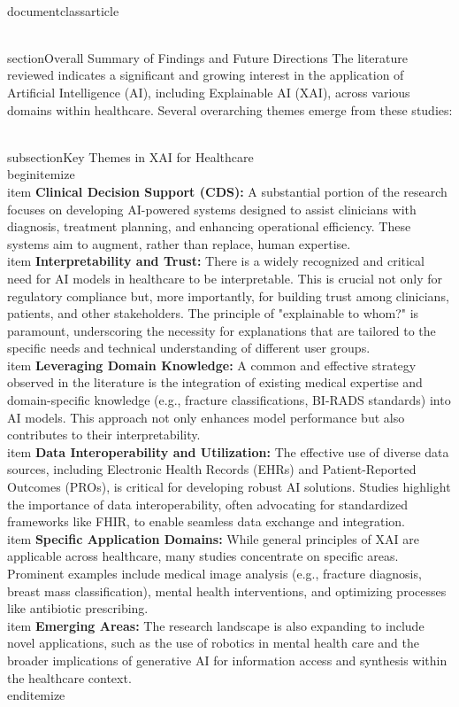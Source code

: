 \\documentclass{article}
\begin{document}
\\section{Overall Summary of Findings and Future Directions}
The literature reviewed indicates a significant and growing interest in the application of Artificial Intelligence (AI), including Explainable AI (XAI), across various domains within healthcare. Several overarching themes emerge from these studies:

\\subsection{Key Themes in XAI for Healthcare}
\\begin{itemize}
    \\item \textbf{Clinical Decision Support (CDS):} A substantial portion of the research focuses on developing AI-powered systems designed to assist clinicians with diagnosis, treatment planning, and enhancing operational efficiency. These systems aim to augment, rather than replace, human expertise.
    \\item \textbf{Interpretability and Trust:} There is a widely recognized and critical need for AI models in healthcare to be interpretable. This is crucial not only for regulatory compliance but, more importantly, for building trust among clinicians, patients, and other stakeholders. The principle of "explainable to whom?" is paramount, underscoring the necessity for explanations that are tailored to the specific needs and technical understanding of different user groups.
    \\item \textbf{Leveraging Domain Knowledge:} A common and effective strategy observed in the literature is the integration of existing medical expertise and domain-specific knowledge (e.g., fracture classifications, BI-RADS standards) into AI models. This approach not only enhances model performance but also contributes to their interpretability.
    \\item \textbf{Data Interoperability and Utilization:} The effective use of diverse data sources, including Electronic Health Records (EHRs) and Patient-Reported Outcomes (PROs), is critical for developing robust AI solutions. Studies highlight the importance of data interoperability, often advocating for standardized frameworks like FHIR, to enable seamless data exchange and integration.
    \\item \textbf{Specific Application Domains:} While general principles of XAI are applicable across healthcare, many studies concentrate on specific areas. Prominent examples include medical image analysis (e.g., fracture diagnosis, breast mass classification), mental health interventions, and optimizing processes like antibiotic prescribing.
    \\item \textbf{Emerging Areas:} The research landscape is also expanding to include novel applications, such as the use of robotics in mental health care and the broader implications of generative AI for information access and synthesis within the healthcare context.
\\end{itemize}
\end{document}
